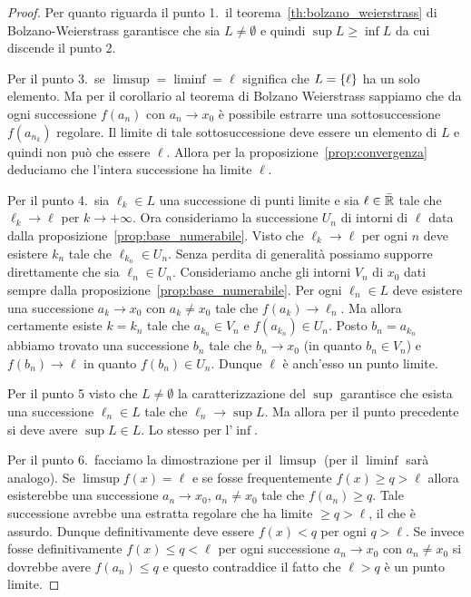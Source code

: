 %
\begin{proof}
  Per quanto riguarda il punto 1.\
  il teorema~\ref{th:bolzano_weierstrass} di Bolzano-Weierstrass
  garantisce che sia $L\neq \emptyset$ e
  quindi $\sup L \ge \inf L$ da cui discende il punto 2.

  Per il punto 3.\ se $\limsup = \liminf = \ell$ significa che $L={\left\{ \ell \right\}}$
  ha un solo elemento. Ma per il corollario al teorema di Bolzano Weierstrass
  sappiamo che da ogni successione $f(a_n)$ con $a_n\to x_0$ 
  è possibile estrarre una sottosuccessione $f(a_{n_k})$ regolare. 
  Il limite di tale sottosuccessione deve essere un elemento di $L$
  e quindi non può che essere $\ell$. 
  Allora per la proposizione~\ref{prop:convergenza}
  deduciamo che l'intera successione ha limite $\ell$.

  Per il punto 4.\ sia $\ell_k\in L$ una successione di punti limite
  e sia $\ell\in \bar {{\mathbb R}}$ tale che $\ell_k \to \ell$ per $k\to +\infty$.
  Ora consideriamo la successione $U_n$ di intorni di $\ell$ 
  data dalla proposizione~\ref{prop:base_numerabile}.
  Visto che $\ell_k\to \ell$ per ogni $n$ deve esistere $k_n$ tale 
  che $\ell_{k_n}\in U_n$. Senza perdita di generalità possiamo 
  supporre direttamente che sia $\ell_n\in U_n$.
  Consideriamo anche gli intorni $V_n$ di $x_0$ dati sempre 
  dalla proposizione~\ref{prop:base_numerabile}.
  Per ogni $\ell_n \in L$ deve esistere una successione $a_k\to x_0$ 
  con $a_k\neq x_0$ tale che $f(a_k)\to \ell_n$.
  Ma allora certamente esiste $k=k_n$ tale che $a_{k_n}\in V_n$ 
  e $f(a_{k_n})\in U_n$. 
  Posto $b_n = a_{k_n}$ abbiamo trovato una successione $b_n$ 
  tale che $b_n\to x_0$ (in quanto $b_n\in V_n$) e $f(b_n)\to \ell$
  in quanto $f(b_n)\in U_n$. Dunque $\ell$ è anch'esso un punto limite. 

  Per il punto 5
  visto che $L\neq \emptyset$ la caratterizzazione del $\sup$
  garantisce che esista una successione $\ell_n\in L$ tale che $\ell_n \to \sup L$.
  Ma allora per il punto precedente si deve avere $\sup L \in L$.
  Lo stesso per l'$\inf$.

  Per il punto 6.\ facciamo la dimostrazione per il $\limsup$ (per il $\liminf$
  sarà analogo). Se $\limsup f(x) = \ell$ e se fosse frequentemente
  $f(x) \ge q > \ell$ allora esisterebbe una successione $a_n\to x_0$, 
  $a_n\neq x_0$ tale che $f(a_n)\ge q$.
  Tale successione avrebbe una estratta regolare
  che ha limite $\ge q> \ell$, il che è assurdo.
  Dunque definitivamente deve essere $f(x) < q$ per ogni $q>\ell$.
  Se invece fosse definitivamente $f(x) \le q < \ell$ per ogni
  successione $a_n\to x_0$ con $a_n\neq x_0$ si dovrebbe avere 
  $f(a_n) \le q$ e questo contraddice il fatto che $\ell>q$ 
  è un punto limite.


\end{proof}
